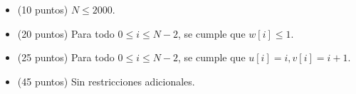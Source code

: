 \documentclass[12pt]{scrartcl}
\begin{document}


    \begin{itemize}
        \item (10 puntos) $N \le 2000$.
        \item (20 puntos) Para todo $0 \le i \le N - 2$, se cumple que $w[i] \le 1$.
        \item (25 puntos) Para todo $0 \le i \le N - 2$, se cumple que $u[i] = i, v[i] = i + 1$.
        \item (45 puntos) Sin restricciones adicionales.
    \end{itemize}
\end{document}
